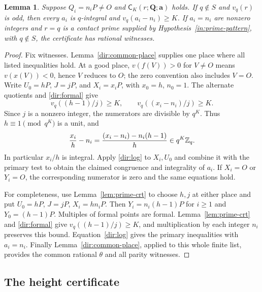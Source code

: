\documentclass[11pt]{article}
\newtheorem{lemma}[theorem]{Lemma}
\theoremstyle{definition}\newtheorem{inputthm}[theorem]{Hypothesis}
\theoremstyle{remark}\newtheorem{remark}[theorem]{Remark}
\begin{document}
\begin{lemma}\label{dir:comparison}
Suppose $Q_i=n_iP\ne O$ and $\mathsf C_K(r;\mathbf Q;\mathbf a)$
holds. If $q\notin S$ and $v_q(r)$ is odd, then every $a_i$ is
$q$-integral and $v_q(a_i-n_i)\ge K$.
If $a_i=n_i$ are nonzero integers and $r=q$ is a contact prime
supplied by Hypothesis~\ref{in:prime-pattern}, with $q\notin S$, the
certificate has rational witnesses.
\end{lemma}
\begin{proof}
Fix witnesses. Lemma~\ref{dir:common-place} supplies one place where
all listed inequalities hold. At a good place, $v(f(V))>0$ for
$V\ne O$ means $v(x(V))<0$, hence $V$ reduces to $O$;
the zero convention also includes $V=O$. Write
$U_0=hP$, $J=jP$, and $X_i=x_iP$, with $x_0=h$, $n_0=1$.
The alternate quotients and \eqref{dir:formal} give
\[
 v_q((h-1)/j)\ge K,\qquad
 v_q((x_i-n_i)/j)\ge K.
\]
Since $j$ is a nonzero integer, the numerators are divisible by
$q^K$. Thus $h\equiv1\pmod{q^K}$ is a unit, and
\[
 \frac{x_i}{h}-n_i
 =\frac{(x_i-n_i)-n_i(h-1)}h\in q^K\mathbb Z_q.
\]
In particular $x_i/h$ is integral. Apply \eqref{dir:log} to
$X_i,U_0$ and combine it with the primary test to obtain the
claimed congruence and integrality of $a_i$. If $X_i=O$ or
$Y_i=O$, the corresponding numerator is zero and the same
equations hold.

For completeness, use Lemma~\ref{lem:prime-crt} to choose $h,j$ at either place and put
$U_0=hP$, $J=jP$, $X_i=hn_iP$. Then
$Y_i=n_i(h-1)P$ for $i\ge1$ and $Y_0=(h-1)P$.
Multiples of formal points are formal. Lemma~\ref{lem:prime-crt} and
\eqref{dir:formal} give $v_q((h-1)/j)\ge K$, and multiplication
by each integer $n_i$ preserves this bound. Equation~\eqref{dir:log}
gives the primary inequalities with $a_i=n_i$. Finally
Lemma~\ref{dir:common-place}, applied to this whole finite list,
provides the common rational $\theta$ and all parity witnesses.
\end{proof}

\subsection{The height certificate}
\end{document}

